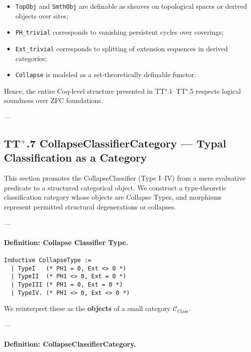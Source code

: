 \documentclass[11pt]{article}
\begin{document}
\begin{itemize}
  \item \texttt{TopObj} and \texttt{SmthObj} are definable as sheaves on topological spaces or derived objects over sites;
  \item \texttt{PH\_trivial} corresponds to vanishing persistent cycles over coverings;
  \item \texttt{Ext\_trivial} corresponds to splitting of extension sequences in derived categories;
  \item \texttt{Collapse} is modeled as a set-theoretically definable functor.
\end{itemize}

Hence, the entire Coq-level structure presented in TT⁺.1–TT⁺.5 respects logical soundness over ZFC foundations.

---

\subsection*{TT$^{+}$.7 CollapseClassifierCategory — Typal Classification as a Category}

This section promotes the CollapseClassifier (Type I–IV) from a mere evaluative predicate  
to a structured categorical object. We construct a type-theoretic classification category  
whose objects are Collapse Types, and morphisms represent permitted structural degenerations or collapses.

---

\paragraph{Definition: Collapse Classifier Type.}

\noindent
\begin{lstlisting}[language=Coq, breaklines=true]
Inductive CollapseType :=
  | TypeI   (* PH1 = 0, Ext <> 0 *)
  | TypeII  (* PH1 <> 0, Ext = 0 *)
  | TypeIII (* PH1 = 0, Ext = 0 *)
  | TypeIV. (* PH1 <> 0, Ext <> 0 *)
\end{lstlisting}


We reinterpret these as the \textbf{objects} of a small category \(\mathcal{C}_{\text{Class}}\).

---

\paragraph{Definition: CollapseClassifierCategory.}
\end{document}
